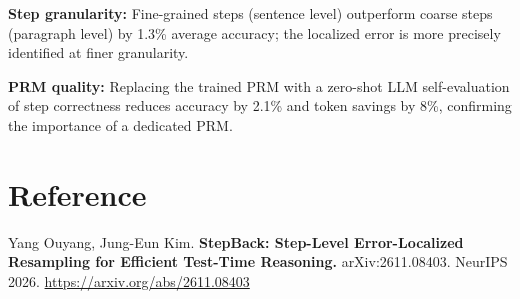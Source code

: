\documentclass[10pt,twocolumn]{article}
\begin{document}
\textbf{Step granularity:} Fine-grained steps (sentence level) outperform
coarse steps (paragraph level) by 1.3\% average accuracy; the localized
error is more precisely identified at finer granularity.

\textbf{PRM quality:} Replacing the trained PRM with a zero-shot LLM
self-evaluation of step correctness reduces accuracy by 2.1\% and token
savings by 8\%, confirming the importance of a dedicated PRM.

\section*{Reference}

Yang Ouyang, Jung-Eun Kim.
\textbf{StepBack: Step-Level Error-Localized Resampling for Efficient
Test-Time Reasoning.}
arXiv:2611.08403. NeurIPS 2026.
\url{https://arxiv.org/abs/2611.08403}
\end{document}
